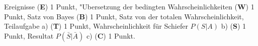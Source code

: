 \begin{bewertung}
Ereignisse ({\bf E}) 1 Punkt,
"Ubersetzung der bedingten Wahrscheinlichkeiten ({\bf W}) 1 Punkt,
Satz von Bayes ({\bf B}) 1 Punkt,
Satz von der totalen Wahrscheinlichkeit, Teilaufgabe a) ({\bf T}) 1 Punkt,
Wahrscheinlichkeit für Schiefer $P(S|A)$ b) ({\bf S}) 1 Punkt,
Resultat $P(\bar S|\bar A)$ c) ({\bf C}) 1 Punkt.
\end{bewertung}

